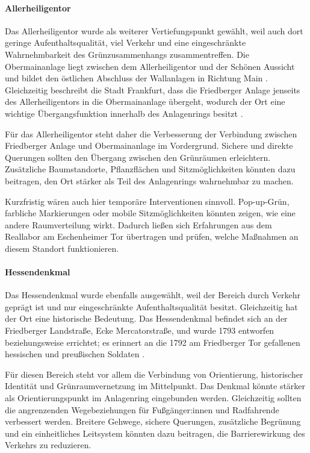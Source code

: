 \documentclass[a4paper,12pt]{article}
\begin{document}
\paragraph{Allerheiligentor}

Das Allerheiligentor wurde als weiterer Vertiefungspunkt gewählt, weil auch dort geringe Aufenthaltsqualität, viel Verkehr und eine eingeschränkte Wahrnehmbarkeit des Grünzusammenhangs zusammentreffen. Die Obermainanlage liegt zwischen dem Allerheiligentor und der Schönen Aussicht und bildet den östlichen Abschluss der Wallanlagen in Richtung Main \autocite{stadtfrankfurtobermainanlage2026}. Gleichzeitig beschreibt die Stadt Frankfurt, dass die Friedberger Anlage jenseits des Allerheiligentors in die Obermainanlage übergeht, wodurch der Ort eine wichtige Übergangsfunktion innerhalb des Anlagenrings besitzt \autocite{stadtfrankfurtfriedbergeranlage2026}.

Für das Allerheiligentor steht daher die Verbesserung der Verbindung zwischen Friedberger Anlage und Obermainanlage im Vordergrund. Sichere und direkte Querungen sollten den Übergang zwischen den Grünräumen erleichtern. Zusätzliche Baumstandorte, Pflanzflächen und Sitzmöglichkeiten könnten dazu beitragen, den Ort stärker als Teil des Anlagenrings wahrnehmbar zu machen.

Kurzfristig wären auch hier temporäre Interventionen sinnvoll. Pop-up-Grün, farbliche Markierungen oder mobile Sitzmöglichkeiten könnten zeigen, wie eine andere Raumverteilung wirkt. Dadurch ließen sich Erfahrungen aus dem Reallabor am Eschenheimer Tor übertragen und prüfen, welche Maßnahmen an diesem Standort funktionieren.

\paragraph{Hessendenkmal}
Das Hessendenkmal wurde ebenfalls ausgewählt, weil der Bereich durch Verkehr geprägt ist und nur eingeschränkte Aufenthaltsqualität besitzt. Gleichzeitig hat der Ort eine historische Bedeutung. Das Hessendenkmal befindet sich an der Friedberger Landstraße, Ecke Mercatorstraße, und wurde 1793 entworfen beziehungsweise errichtet; es erinnert an die 1792 am Friedberger Tor gefallenen hessischen und preußischen Soldaten \autocite{kunstimoeffentlichenraumhessendenkmal2026}.

Für diesen Bereich steht vor allem die Verbindung von Orientierung, historischer Identität und Grünraumvernetzung im Mittelpunkt. Das Denkmal könnte stärker als Orientierungspunkt im Anlagenring eingebunden werden. Gleichzeitig sollten die angrenzenden Wegebeziehungen für Fußgänger:innen und Radfahrende verbessert werden. Breitere Gehwege, sichere Querungen, zusätzliche Begrünung und ein einheitliches Leitsystem könnten dazu beitragen, die Barrierewirkung des Verkehrs zu reduzieren.
\end{document}
